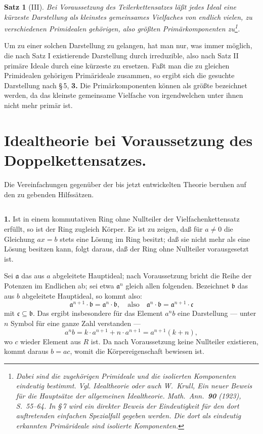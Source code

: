 \documentclass[12pt,a4paper]{article}
\theoremstyle{plain}
\newtheorem{Satz}{Satz}[section]
\theoremstyle{definition}
\theoremstyle{remark}
\begin{document}
\begin{Satz}[III]
Bei Voraussetzung des Teilerkettensatzes läßt jedes Ideal eine kürzeste Darstellung als kleinstes gemeinsames Vielfaches von endlich vielen, zu verschiedenen Primidealen gehörigen, also \textit{größten} Primärkomponenten zu\footnote{Dabei sind die zugehörigen Primideale und die isolierten Komponenten eindeutig bestimmt. Vgl. Idealtheorie oder auch W.~Krull, Ein neuer Beweis für die Hauptsätze der allgemeinen Idealtheorie. Math.\ Ann.\ \textbf{90} (1923), S.~55--64. In \S\,7 wird ein direkter Beweis der Eindeutigkeit für den dort auftretenden einfachen Spezialfall gegeben werden. Die dort als eindeutig erkannten Primärideale sind isolierte Komponenten.}.
\end{Satz}

Um zu einer solchen Darstellung zu gelangen, hat man nur, was immer möglich, die nach Satz I existierende Darstellung durch irreduzible, also nach Satz II primäre Ideale durch eine kürzeste zu ersetzen. Faßt man die zu gleichen Primidealen gehörigen Primärideale zusammen, so ergibt sich die gesuchte Darstellung nach \S\,5, \textbf{3.} Die Primärkomponenten können als größte bezeichnet werden, da das kleinste gemeinsame Vielfache von irgendwelchen unter ihnen nicht mehr primär ist.

\newpage
\section{Idealtheorie bei Voraussetzung des Doppelkettensatzes.}

\noindent
Die Vereinfachungen gegenüber der bis jetzt entwickelten Theorie beruhen auf den zu gebenden Hilfssätzen.

\setcounter{Satz}{0}
\subsection{}

\noindent
\textbf{1.} Ist in einem kommutativen Ring ohne Nullteiler der Vielfachenkettensatz erfüllt, so ist der Ring zugleich Körper. Es ist zu zeigen, daß für $a \neq 0$ die Gleichung $ax = b$ stets eine Lösung im Ring besitzt; daß sie nicht mehr als eine Lösung besitzen kann, folgt daraus, daß der Ring ohne Nullteiler vorausgesetzt ist.

Sei $\mathfrak{a}$ das aus $a$ abgeleitete Hauptideal; nach Voraussetzung bricht die Reihe der Potenzen im Endlichen ab; sei etwa $\mathfrak{a}^{n}$ gleich allen folgenden. Bezeichnet $\mathfrak{b}$ das aus $b$ abgeleitete Hauptideal, so kommt also:
\[
\mathfrak{a}^{n+1} \cdot \mathfrak{b} = \mathfrak{a}^{n} \cdot \mathfrak{b}, \quad \text{also} \quad \mathfrak{a}^{n} \cdot \mathfrak{b} = \mathfrak{a}^{n+1} \cdot \mathfrak{c}
\]
mit $\mathfrak{c} \subseteq \mathfrak{b}$. Das ergibt insbesondere für das Element $a^{n}b$ eine Darstellung --- unter $n$ Symbol für eine ganze Zahl verstanden ---
\[
a^{n}b = k \cdot a^{n+1} + n \cdot a^{n+1} = a^{n+1}(k + n),
\]
wo $c$ wieder Element aus $R$ ist. Da nach Voraussetzung keine Nullteiler existieren, kommt daraus $b = ac$, womit die Körpereigenschaft bewiesen ist.
\end{document}
